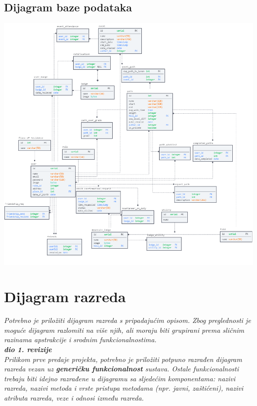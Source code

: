 			\subsection{Dijagram baze podataka}
				
				\includegraphics{slike/database.png}
			
			\eject
			
			
		\section{Dijagram razreda}
		
			\textit{Potrebno je priložiti dijagram razreda s pripadajućim opisom. Zbog preglednosti je moguće dijagram razlomiti na više njih, ali moraju biti grupirani prema sličnim razinama apstrakcije i srodnim funkcionalnostima.}\\
			
			\textbf{\textit{dio 1. revizije}}\\
			
			\textit{Prilikom prve predaje projekta, potrebno je priložiti potpuno razrađen dijagram razreda vezan uz \textbf{generičku funkcionalnost} sustava. Ostale funkcionalnosti trebaju biti idejno razrađene u dijagramu sa sljedećim komponentama: nazivi razreda, nazivi metoda i vrste pristupa metodama (npr. javni, zaštićeni), nazivi atributa razreda, veze i odnosi između razreda.}\\
			
